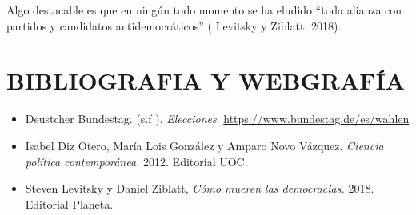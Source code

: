\documentclass[
]{article}
\begin{document}
Algo destacable es que en ningún todo momento se ha eludido ``toda
alianza con partidos y candidatos antidemocráticos'' ( Levitsky y
Ziblatt: 2018).

\hypertarget{bibliografia-y-webgrafuxeda}{%
\section{BIBLIOGRAFIA Y WEBGRAFÍA}\label{bibliografia-y-webgrafuxeda}}

\begin{itemize}
\item
  Deustcher Bundestag. (s.f ). \emph{Elecciones}.
  \url{https://www.bundestag.de/es/wahlen}
\item
  Isabel Diz Otero, María Lois González y Amparo Novo Vázquez.
  \emph{Ciencia política contemporánea.} 2012. Editorial UOC.
\item
  Steven Levitsky y Daniel Ziblatt, \emph{Cómo mueren las democracias.}
  2018. Editorial Planeta.
\end{itemize}
\end{document}
